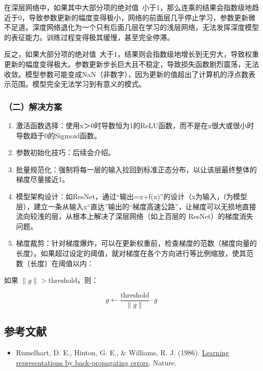 在深层网络中，如果其中大部分项的绝对值~小于1，那么连乘的结果会指数级地趋近于0，导致参数更新的幅度变得极小，网络的前面层几乎停止学习，参数更新微不足道。深度网络退化为一个只有后面几层在学习的浅层网络，无法发挥深度模型的表征能力。训练过程变得极其缓慢，甚至完全停滞。

反之，如果大部分项的绝对值~大于1，结果则会指数级地增长到无穷大，导致权重更新的幅度变得极大。参数更新步长巨大且不稳定，导致损失函数剧烈震荡，无法收敛。模型参数可能变成NaN（非数字），因为更新的值超出了计算机的浮点数表示范围。模型完全无法学习到有意义的模式。

\hypertarget{ux4e8cux89e3ux51b3ux65b9ux6848}{%
\subsubsection{（二）解决方案}\label{ux4e8cux89e3ux51b3ux65b9ux6848}}

\begin{enumerate}
\def\labelenumi{\arabic{enumi}.}
\item
  激活函数选择：使用x＞0时导数恒为1的ReLU函数，而不是在x很大或很小时导数趋于0的Sigmoid函数。
\item
  参数初始化技巧：后续会介绍。
\item
  批量规范化：强制将每一层的输入拉回到标准正态分布，以让该层最终整体的梯度尽量接近1。
\item
  模型架构设计：如ResNet，通过``输出=x+f(x)''的设计（x为输入，f为模型层），建立一条从输入x``直达''输出的``梯度高速公路''，让梯度可以无损地直接流向较浅的层，从根本上解决了深层网络（如上百层的 ResNet）的梯度消失问题。
\item
  梯度裁剪：针对梯度爆炸，可以在更新权重前，检查梯度的范数（梯度向量的长度）。如果超过设定的阈值，就对梯度在各个方向进行等比例缩放，使其范数（长度）在阈值以内：
\end{enumerate}

如果 \(\lVert g\rVert > \text{threshold}\)，则：

\[
g\leftarrow \frac{\text{threshold}}{\lVert g\rVert}\cdot g
\]

\hypertarget{ux53c2ux8003ux6587ux732e-1}{%
\subsection{参考文献}\label{ux53c2ux8003ux6587ux732e-1}}

\begin{itemize}
\tightlist
\item
  Rumelhart, D. E., Hinton, G. E., \& Williams, R. J. (1986). \href{https://doi.org/10.1038/323533a0}{Learning representations by back-propagating errors}. Nature.
\end{itemize}

